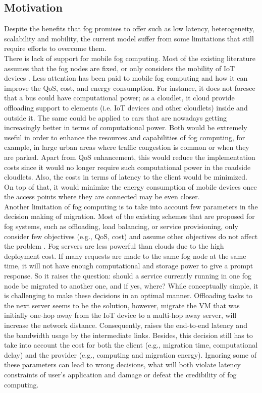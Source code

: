\subsection{Motivation}\label{subsec:Motivation}
\noindent\tab Despite the benefits that fog promises to offer such as low
latency, heterogeneity, scalability and mobility, the current model suffer from
some limitations that still require efforts to overcome them.\\
\noindent\tab There is lack of support for mobile fog computing. Most of the
existing literature assumes that the fog nodes are fixed, or only considers the
mobility of IoT devices \cite{yousefpour2018all}. Less attention has been paid
to mobile fog computing and how it can improve the QoS, cost, and energy
consumption. For instance, it does not foresee that a bus could have
computational power; as a cloudlet, it cloud provide offloading support to
elements (i.e. IoT devices and other cloudlets) inside and outside it. The same
could be applied to cars that are nowadays getting increasingly better in terms
of computational power. Both would be extremely useful in order to enhance the
resources and capabilities of fog computing, for example, in large urban areas
where traffic congestion is common or when they are parked. Apart from QoS
enhancement, this would reduce the implementation costs since it would no longer
require such computational power in the roadside cloudlets. Also, the costs in
terms of latency to the client would be minimized. On top of that, it would
minimize the energy consumption of mobile devices once the access points where
they are connected may be even closer.\\
\noindent\tab Another limitation of fog computing is to take into account few
parameters in the decision making of migration. Most of the existing schemes
that are proposed for fog systems, such as offloading, load balancing, or
service provisioning, only consider few objectives (e.g., QoS, cost) and assume
other objectives do not affect the problem \cite{yousefpour2018all}. Fog servers
are less powerful than clouds due to the high deployment cost. If many requests
are made to the same fog node at the same time, it will not have enough
computational and storage power to give a prompt response. So it raises the
question: should a service currently running in one fog node be migrated to
another one, and if yes, where? While conceptually simple, it is challenging to
make these decisions in an optimal manner. Offloading tasks to the next server
seems to be the solution, however, migrate the VM that was initially one-hop
away from the IoT device to a multi-hop away server, will increase the network
distance. Consequently, raises the end-to-end latency and the bandwidth usage by
the intermediate links. Besides, this decision still has to take into account
the cost for both the client (e.g., migration time, computational delay) and the
provider (e.g., computing and migration energy). Ignoring some of these
parameters can lead to wrong decisions, what will both violate latency
constraints of user's application and damage or defeat the credibility of fog
computing.

